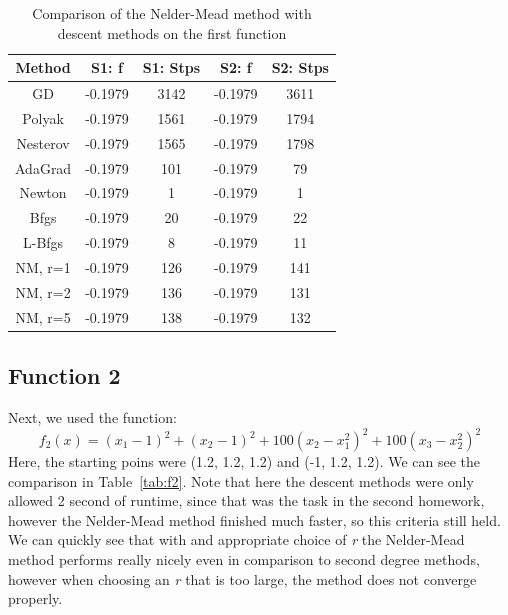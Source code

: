 \documentclass[9pt]{IEEEtran}
\begin{document}
\begin{table}[h!]
    \centering
    \begin{tabular}{|c|c|c|c|c|}
        \hline
        \textbf{Method} & \textbf{S1: f} & \textbf{S1: Stps} & \textbf{S2: f} & \textbf{S2: Stps} \\ \hline
        GD         & -0.1979  & 3142  & -0.1979  & 3611 \\ \hline
        Polyak     & -0.1979  & 1561  & -0.1979  & 1794 \\ \hline
        Nesterov   & -0.1979  & 1565  & -0.1979  & 1798 \\ \hline
        AdaGrad    & -0.1979  & 101   & -0.1979  & 79   \\ \hline
        Newton     & -0.1979  & 1     & -0.1979  & 1    \\ \hline
        Bfgs       & -0.1979  & 20    & -0.1979  & 22   \\ \hline
        L-Bfgs    & -0.1979  & 8     & -0.1979  & 11   \\ \hline
        NM, r=1 & -0.1979 & 126 & -0.1979 & 141  \\ \hline
        NM, r=2 & -0.1979 & 136 & -0.1979 & 131  \\ \hline
        NM, r=5 & -0.1979 & 138 & -0.1979 & 132  \\ \hline

    \end{tabular}
    \vspace{3pt}
    \caption{Comparison of the Nelder-Mead method with descent methods on the first 
    function}
    \label{tab:f1}
\end{table}

\subsection*{Function 2}
Next, we used the function:
\[
f_2(x) = (x_1 - 1)^2 + (x_2 - 1)^2 + 100(x_2 - x_1^2)^2 + 100(x_3 - x_2^2)^2
\]
Here, the starting poins were (1.2, 1.2, 1.2) and (-1, 1.2, 1.2). 
We can see the comparison in Table~\ref{tab:f2}. Note that here the descent methods 
were only allowed 2 second of runtime, since that was the task in the second homework, however the 
Nelder-Mead method finished much faster, so this criteria still held.
We can quickly see that with and appropriate choice of \textit{r} the 
Nelder-Mead method performs really nicely even in comparison to second degree 
methods, however when choosing 
an \textit{r} that is too large, the method does not converge properly.
\end{document}
